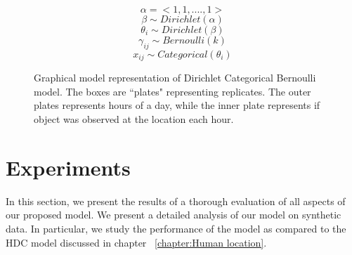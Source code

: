 \noindent
\begin{figure}[htp]
\qquad
\begin{minipage}{0.3\textwidth}
\centering


\end{minipage}%
\begin{minipage}{0.7\textwidth}

\begin{equation*}
	\alpha = <1, 1, .... , 1 > 
\end{equation*}
\begin{equation*}
	\beta \sim Dirichlet(\alpha)
\end{equation*}
\begin{equation*}
	\theta_i  \sim Dirichlet(\beta)
\end{equation*}
\begin{equation*}
	\gamma_{ij}  \sim Bernoulli(k)
\end{equation*}
\begin{equation*}
	x_{ij} \sim Categorical(\theta_i)
\end{equation*}
\end{minipage}

\caption[Dirichlet Categorical Bernoulli graphical model]{Graphical model representation of Dirichlet Categorical Bernoulli model. The boxes are ``plates" representing replicates. The outer plates represents hours of a day, while the inner plate represents if object was observed at the location each hour.}
\label{dcbm}
\end{figure}



\section{Experiments}

In this section, we present the results of a thorough evaluation of all aspects of our proposed model. We present a detailed analysis of our model on synthetic data. In particular, we study the performance of the model as compared to the HDC model discussed in chapter ~\ref{chapter:Human location}.


